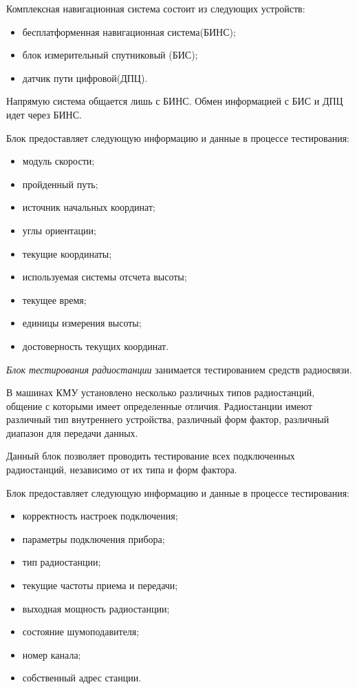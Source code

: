 Комплексная навигационная система состоит из следующих устройств:
\begin{itemize}
	\item бесплатформенная навигационная система(БИНС);
	\item блок измерительный спутниковый (БИС);
	\item датчик пути цифровой(ДПЦ).
\end{itemize}

Напрямую система общается лишь с БИНС. Обмен информацией с БИС и ДПЦ идет через БИНС.

Блок предоставляет следующую информацию и данные в процессе тестирования:
\begin{itemize}
		\item модуль скорости;
		\item пройденный путь;
		\item источник начальных координат;
		\item углы ориентации;
		\item текущие координаты;
		\item используемая системы отсчета высоты;
		\item текущее время;
		\item единицы измерения высоты;
		\item достоверность текущих координат.
\end{itemize}


\textit{Блок тестирования радиостанции} занимается тестированием средств радиосвязи.

В машинах КМУ установлено несколько различных типов радиостанций, общение с которыми имеет определенные отличия.
Радиостанции имеют
различный тип внутреннего устройства, различный форм фактор, различный диапазон для передачи данных.

Данный блок позволяет проводить тестирование всех подключенных радиостанций, независимо от их типа и форм фактора.

Блок предоставляет следующую информацию и данные в процессе тестирования:
\begin{itemize}
		\item корректность настроек подключения;
		\item параметры подключения прибора;
		\item тип радиостанции;
		\item текущие частоты приема и передачи;
		\item выходная мощность радиостанции;
		\item состояние шумоподавителя;
		\item номер канала;
		\item собственный адрес станции.
\end{itemize}

